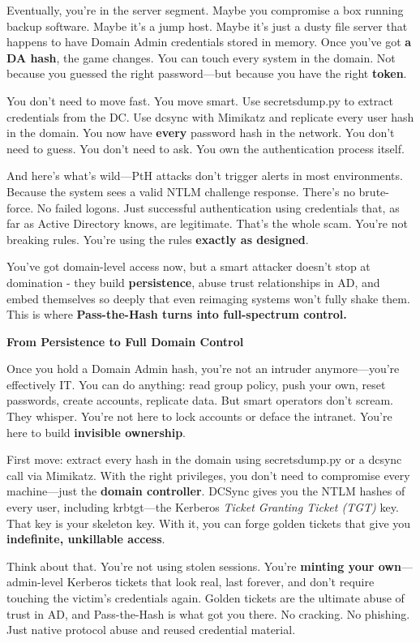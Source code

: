 Eventually, you’re in the server segment. Maybe you compromise a box running backup software. Maybe it's a jump host. Maybe it's just a dusty file server that happens to have Domain Admin credentials stored in memory. Once you’ve got \textbf{a DA hash}, the game changes. You can touch every system in the domain. Not because you guessed the right password—but because you have the right \textbf{token}.

You don’t need to move fast. You move smart. Use secretsdump.py to extract credentials from the DC. Use dcsync with Mimikatz and replicate every user hash in the domain. You now have \textbf{every} password hash in the network. You don’t need to guess. You don’t need to ask. You own the authentication process itself.

And here’s what’s wild—PtH attacks don’t trigger alerts in most environments. Because the system sees a valid NTLM challenge response. There’s no brute-force. No failed logons. Just successful authentication using credentials that, as far as Active Directory knows, are legitimate. That’s the whole scam. You’re not breaking rules. You’re using the rules \textbf{exactly as designed}.

You’ve got domain-level access now, but a smart attacker doesn’t stop at domination - they build \textbf{persistence}, abuse trust relationships in AD, and embed themselves so deeply that even reimaging systems won’t fully shake them. This is where \textbf{Pass-the-Hash turns into full-spectrum control.}

\textbf{From Persistence to Full Domain Control}

Once you hold a Domain Admin hash, you're not an intruder anymore—you’re effectively IT. You can do anything: read group policy, push your own, reset passwords, create accounts, replicate data. But smart operators don’t scream. They whisper. You’re not here to lock accounts or deface the intranet. You’re here to build \textbf{invisible ownership}.

First move: extract every hash in the domain using secretsdump.py or a dcsync call via Mimikatz. With the right privileges, you don’t need to compromise every machine—just the \textbf{domain controller}. DCSync gives you the NTLM hashes of every user, including krbtgt—the Kerberos \textit{Ticket Granting Ticket (TGT)} key. That key is your skeleton key. With it, you can forge golden tickets that give you \textbf{indefinite, unkillable access}.

Think about that. You're not using stolen sessions. You're \textbf{minting your own}—admin-level Kerberos tickets that look real, last forever, and don’t require touching the victim’s credentials again. Golden tickets are the ultimate abuse of trust in AD, and Pass-the-Hash is what got you there. No cracking. No phishing. Just native protocol abuse and reused credential material.

